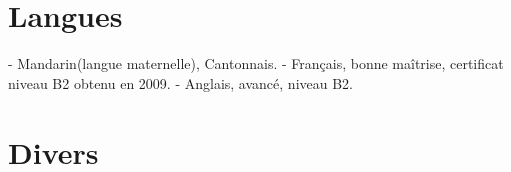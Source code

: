 \documentclass[11pt,a4paper]{moderncv}
\begin{document}
\section{Langues}
\cvline{}
{
- Mandarin(langue maternelle), Cantonnais.\newline
- Français, bonne maîtrise, certificat niveau B2 obtenu en 2009.\newline
- Anglais, avancé, niveau B2.
}

\section{Divers}
\end{document}
